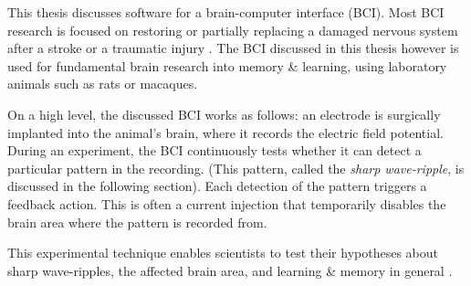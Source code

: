 \label{sec:BCI}

This thesis discusses software for a brain-computer interface (BCI).\footnotemark{} Most BCI research is focused on restoring or partially replacing a damaged nervous system after a stroke or a traumatic injury \cite{Krucoff2016}. The BCI discussed in this thesis however is used for fundamental brain research into memory \& learning, using laboratory animals such as rats or macaques.


On a high level, the discussed BCI works as follows: an electrode is surgically implanted into the animal's brain, where it records the electric field potential. During an experiment, the BCI continuously tests whether it can detect a particular pattern in the recording. (This pattern, called the \emph{sharp wave-ripple}, is discussed in the following section). Each detection of the pattern triggers a feedback action. This is often a current injection that temporarily disables the brain area where the pattern is recorded from.

This experimental technique enables scientists to test their hypotheses about sharp wave-ripples, the affected brain area, and learning \& memory in general \cite{Ego-Stengel2009,Girardeau2009,Jadhav2012,Girardeau2014,Talakoub2016}.
